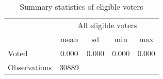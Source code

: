 \begin{table}[htbp]\centering
\def\sym#1{\ifmmode^{#1}\else\(^{#1}\)\fi}
\caption{Summary statistics of eligible voters}
\begin{tabular}{l*{1}{cccc}}
\toprule
                &\multicolumn{4}{c}{All eligible voters}\\
                &     mean&       sd&      min&      max\\
\midrule
Voted           &    0.000&    0.000&    0.000&    0.000\\
\midrule
Observations    &    30889&         &         &         \\
\bottomrule
\end{tabular}
\end{table}
